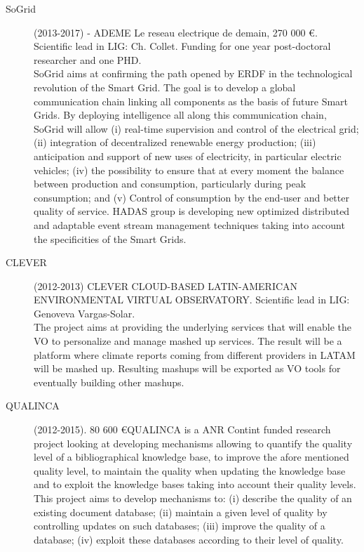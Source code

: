 \begin{description}
\item[SoGrid]  (2013-2017) - ADEME Le reseau  electrique de demain, 270 000 \euro. Scientific lead in LIG: Ch. Collet. Funding for one year post-doctoral researcher and one PHD. \\
SoGrid aims at confirming the path opened by ERDF in the technological revolution of the Smart Grid. The goal is to develop a global communication chain linking all components as the basis of future Smart Grids. By deploying intelligence all along this communication chain, SoGrid will allow (i) real-time supervision and control of the electrical grid; (ii) integration of decentralized renewable energy production; (iii) anticipation and support of new uses of electricity, in particular electric vehicles; (iv) the possibility to ensure that at every moment the  balance between production and consumption, particularly during peak consumption;  and (v) Control of consumption by the end-user and better quality of service. HADAS group is developing new optimized distributed and adaptable event stream management techniques taking into account the specificities of the Smart Grids.

\item[CLEVER] (2012-2013)  CLEVER CLOUD-BASED LATIN-AMERICAN ENVIRONMENTAL VIRTUAL OBSERVATORY. Scientific lead in LIG: Genoveva Vargas-Solar. \\
The project aims at providing the underlying services that will enable the VO to personalize and manage mashed up services. The result will be a platform where climate reports coming from different providers in LATAM will be mashed up. Resulting mashups will be exported as VO tools for eventually building other mashups.

\item[QUALINCA] (2012-2015). 80 600 \euro QUALINCA is a ANR Contint funded research project looking at developing mechanisms allowing to quantify the quality level of a bibliographical knowledge base, to improve the afore mentioned quality level, to maintain the quality when updating the knowledge base and to exploit the knowledge bases taking into account their quality levels. This project aims to develop mechanisms to: (i) describe the quality of an existing document database; (ii) maintain a given level of quality by controlling updates on such databases; (iii) improve the quality of a database; (iv) exploit these databases according to their level of quality.


\end{description}
